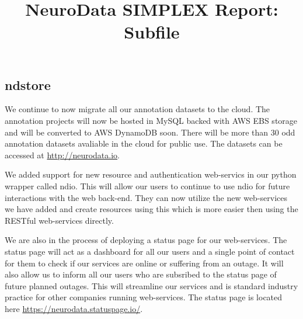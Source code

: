 \documentclass[simplex.tex]{subfiles}
\title{NeuroData SIMPLEX Report: Subfile}
\begin{document}

\subsection{ndstore}

We continue to now migrate all our annotation datasets to the cloud. The annotation projects will now be hosted in MySQL backed with AWS EBS storage and will be converted to AWS DynamoDB soon. There will be more than 30 odd annotation datasets avaliable in the cloud for public use. The datasets can be accessed at \href{http://neurodata.io}{http://neurodata.io}.

We added support for new resource and authentication web-servics in our python wrapper called ndio. This will allow our users to continue to use ndio for future interactions with the web back-end. They can now utilize the new web-services we have added and create resources using this which is more easier then using the RESTful web-services directly.

We are also in the process of deploying a status page for our web-services. The status page will act as a dashboard for all our users and a single point of contact for them to check if our services are online or suffering from an outage. It will also allow us to inform all our users who are subsribed to the status page of future planned outages. This will streamline our services and is standard industry practice for other companies running web-services. The status page is located here \href{https://neurodata.statuspage.io/}{https://neurodata.statuspage.io/}.
\end{document}
